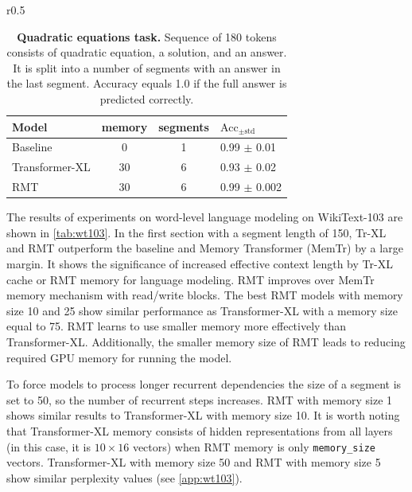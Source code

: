   \begin{table}{r}{0.5\linewidth}
  \vspace{-0.2in}
  \caption{\small \textbf{Quadratic equations task.} Sequence of 180 tokens consists of quadratic equation, a solution, and an answer. It is split into a number of segments with an answer in the last segment. Accuracy equals 1.0 if the full answer is predicted correctly.}
  \label{tab:quadratic_eq}
  \begin{center}
  \begin{small}
  \begin{sc}
  \fontsize{7}{8}
  \selectfont 
  \begin{tabular}{lccl}
  \toprule
  Model          & memory & segments & $\text{Acc}_{\pm \text{std}}$ \\
  \midrule
  Baseline        &  0           &  1          & 0.99 \tiny{$\pm$ 0.01} \\
  Transformer-XL           &  30          &  6          & 0.93 \tiny{$\pm$ 0.02} \\
  RMT             &  30          &  6          & 0.99 \tiny{$\pm$ 0.002} \\
  \bottomrule
  \end{tabular}
  \end{sc}
  \end{small}
  \end{center}
  \vskip -0.2in
  \end{table}
  
  
  The results of experiments on word-level language modeling on WikiText-103 are shown in \cref{tab:wt103}. In the first section with a segment length of 150, Tr-XL and RMT outperform the baseline and Memory Transformer (MemTr) by a large margin. It shows the significance of increased effective context length by Tr-XL cache or RMT memory for language modeling.
  RMT improves over MemTr memory mechanism with read/write blocks. The best RMT models with memory size 10 and 25 show similar performance as Transformer-XL with a memory size equal to 75. RMT learns to use smaller memory more effectively than Transformer-XL. Additionally, the smaller memory size of RMT leads to reducing required GPU memory for running the model.
  
  
  
  To force models to process longer recurrent dependencies the size of a segment is set to 50, so the number of recurrent steps increases. RMT with memory size 1 shows similar results to Transformer-XL with memory size 10. It is worth noting that Transformer-XL memory consists of hidden representations from all layers (in this case, it is $10 \times 16$ vectors) when RMT memory is only \texttt{memory\_size} vectors. Transformer-XL with memory size 50 and RMT with memory size 5 show similar perplexity values (see \cref{app:wt103}).
  
